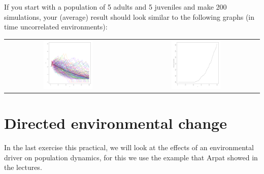 \documentclass{article}\usepackage[]{graphicx}\usepackage[]{color}
\begin{document}
If you start with a population of 5 adults and 5 juveniles and make 200 simulations, your (average) result should look similar to the following graphs (in time uncorrelated environments):
\begin{center}
\begin{tabular}{c c}

\includegraphics[width=0.40\textwidth]{figure/simop-1} 
 & 
\includegraphics[width=0.40\textwidth]{figure/simop-2} 

\end{tabular}
\end{center}

\section{Directed environmental change}
In the last exercise this practical, we will look at the effects of an environmental driver on population dynamics, for this we use the example that Arpat showed in the lectures. 
\end{document}
